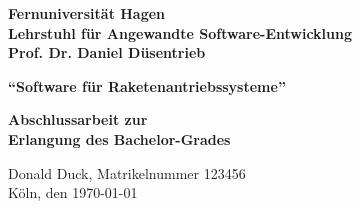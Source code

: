 \documentclass[12pt,ngerman,parskip=half]{scrreport}
\begin{document}
\begin{titlepage}
\textbf{\large Fernuniversität Hagen \\
Lehrstuhl für Angewandte Software-Entwicklung \\
Prof. Dr. Daniel Düsentrieb}\vspace*{4cm}

\begin{center}
\textbf{\huge \enquote{Software für Raketenantriebssysteme}}
\end{center}\vspace*{2cm}


\begin{center}
\textbf{\Large Abschlussarbeit zur \\
Erlangung des Bachelor-Grades}
\end{center}

\vfill
Donald Duck, Matrikelnummer 123456 \\
Köln, den \today
\end{titlepage}


\tableofcontents

\listoffigures

\listoftables






\end{document}

